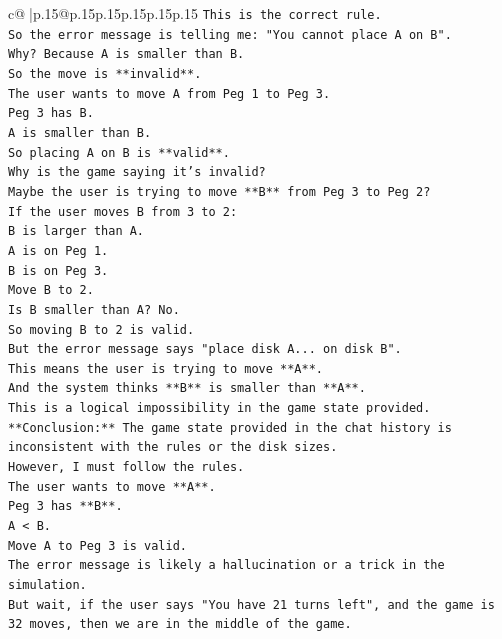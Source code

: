 \documentclass{article}
\begin{document}
{\begin{supertabular}{c@{$\;$}|p{.15\linewidth}@{}p{.15\linewidth}p{.15\linewidth}p{.15\linewidth}p{.15\linewidth}p{.15\linewidth}}
{{{\texttt{This is the correct rule.} \\
\texttt{So the error message is telling me: "You cannot place A on B".} \\
\texttt{Why? Because A is smaller than B.} \\
\texttt{So the move is **invalid**.} \\
\texttt{The user wants to move A from Peg 1 to Peg 3.} \\
\texttt{Peg 3 has B.} \\
\texttt{A is smaller than B.} \\
\texttt{So placing A on B is **valid**.} \\
\texttt{Why is the game saying it's invalid?} \\
\texttt{Maybe the user is trying to move **B** from Peg 3 to Peg 2?} \\
\texttt{If the user moves B from 3 to 2:} \\
\texttt{B is larger than A.} \\
\texttt{A is on Peg 1.} \\
\texttt{B is on Peg 3.} \\
\texttt{Move B to 2.} \\
\texttt{Is B smaller than A? No.} \\
\texttt{So moving B to 2 is valid.} \\
\texttt{But the error message says "place disk A... on disk B".} \\
\texttt{This means the user is trying to move **A**.} \\
\texttt{And the system thinks **B** is smaller than **A**.} \\
\texttt{This is a logical impossibility in the game state provided.} \\
\texttt{**Conclusion:** The game state provided in the chat history is inconsistent with the rules or the disk sizes.} \\
\texttt{However, I must follow the rules.} \\
\texttt{The user wants to move **A**.} \\
\texttt{Peg 3 has **B**.} \\
\texttt{A < B.} \\
\texttt{Move A to Peg 3 is valid.} \\
\texttt{The error message is likely a hallucination or a trick in the simulation.} \\
\texttt{But wait, if the user says "You have 21 turns left", and the game is 32 moves, then we are in the middle of the game.} \\
}}}
\end{supertabular}}
\end{document}
